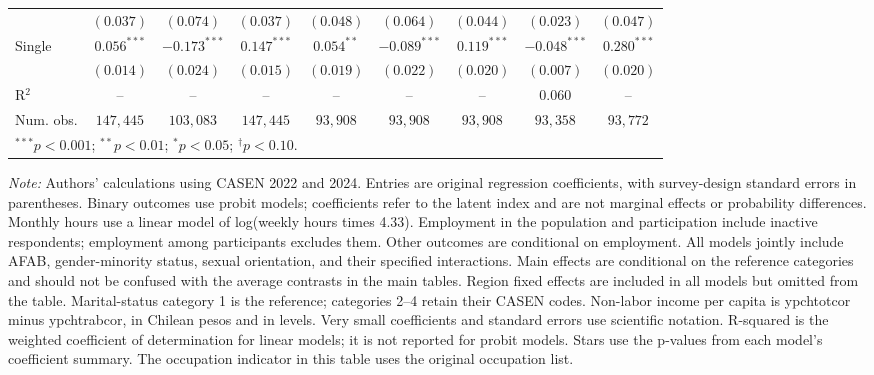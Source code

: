 \begin{table}[htpb]
{\begin{tabular}{l c c c c c c c c}
 & $(0.037)$ & $(0.074)$ & $(0.037)$ & $(0.048)$ & $(0.064)$ & $(0.044)$ & $(0.023)$ & $(0.047)$ \\
Single & $0.056^{***}$ & $-0.173^{***}$ & $0.147^{***}$ & $0.054^{**}$ & $-0.089^{***}$ & $0.119^{***}$ & $-0.048^{***}$ & $0.280^{***}$ \\
 & $(0.014)$ & $(0.024)$ & $(0.015)$ & $(0.019)$ & $(0.022)$ & $(0.020)$ & $(0.007)$ & $(0.020)$ \\
\hline
R$^2$ & -- & -- & -- & -- & -- & -- & $0.060$ & -- \\
Num. obs. & $147,445$ & $103,083$ & $147,445$ & $93,908$ & $93,908$ & $93,908$ & $93,358$ & $93,772$ \\
\hline
\multicolumn{9}{l}{\scriptsize $^{***}p<0.001$; $^{**}p<0.01$; $^{*}p<0.05$; $^{\dagger}p<0.10$.} \\
\end{tabular}%
}
\par\smallskip
\begin{minipage}{\textwidth}\footnotesize\raggedright
\textit{Note:} Authors' calculations using CASEN 2022 and 2024. Entries are original regression coefficients, with survey-design standard errors in parentheses. Binary outcomes use probit models; coefficients refer to the latent index and are not marginal effects or probability differences. Monthly hours use a linear model of log(weekly hours times 4.33). Employment in the population and participation include inactive respondents; employment among participants excludes them. Other outcomes are conditional on employment. All models jointly include AFAB, gender-minority status, sexual orientation, and their specified interactions. Main effects are conditional on the reference categories and should not be confused with the average contrasts in the main tables. Region fixed effects are included in all models but omitted from the table. Marital-status category 1 is the reference; categories 2--4 retain their CASEN codes. Non-labor income per capita is ypchtotcor minus ypchtrabcor, in Chilean pesos and in levels. Very small coefficients and standard errors use scientific notation. R-squared is the weighted coefficient of determination for linear models; it is not reported for probit models. Stars use the p-values from each model's coefficient summary. The occupation indicator in this table uses the original occupation list.
\end{minipage}
\end{table}
